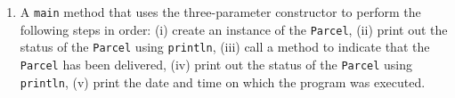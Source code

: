 \documentclass[12pt]{article}
\begin{document}
\begin{enumerate}
\begin{enumerate}
    \item A {\tt main} method that uses the three-parameter
      constructor to perform the following steps in order: (i) create
      an instance of the {\tt Parcel}, (ii) print out the status of
      the {\tt Parcel} using {\tt println}, (iii) call a method to
      indicate that the {\tt Parcel} has been delivered, (iv) print
      out the status of the {\tt Parcel} using {\tt println}, (v)
      print the date and time on which the program was executed.

  \end{enumerate}

\end{enumerate}
\end{document}
